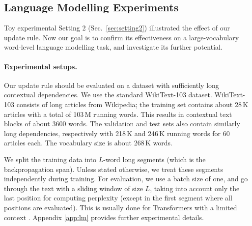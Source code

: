 \documentclass{article}
\theoremstyle{definition}
\begin{document}
\subsection{Language Modelling Experiments}
\label{sec:lm}
Toy experimental Setting 2 (Sec.~\ref{sec:setting2}) illustrated
the effect of our update rule.
Now our goal is to confirm its effectiveness
on a large-vocabulary word-level language modelling task,
and investigate its further potential.

\paragraph{Experimental setups.}
Our update rule should be evaluated on
a dataset with sufficiently long contextual dependencies.
We use the standard WikiText-103 \citep{merity2016pointer} dataset.
WikiText-103 consists of long articles from Wikipedia;
the training set contains about 28\,K articles with a total of 103\,M running words.
This results in contextual text blocks of about 3600 words.
The validation and test sets also contain similarly long dependencies,
respectively with 218\,K and 246\,K running words for 60 articles each.
The vocabulary size is about 268\,K words.

We split the training data into $L$-word long segments
(which is the backpropagation span).
Unless stated otherwise, we treat these segments independently 
during training.
For evaluation, we use a batch size of one, 
and go through the text with a sliding window of size $L$, taking
into account only the last position for computing perplexity (except
in the first segment where all positions are evaluated). This
is usually done for Transformers with a limited context \cite{al2018character}.
Appendix \ref{app:lm} provides further experimental details.
\end{document}
